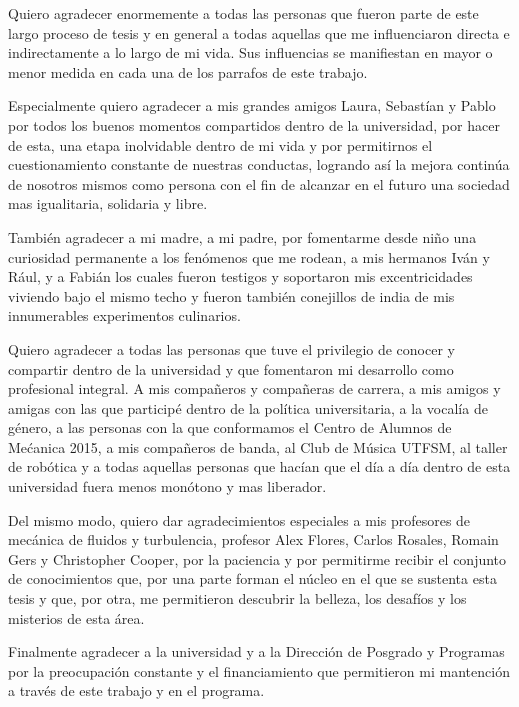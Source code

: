 \vspace{-1.5cm}

Quiero agradecer enormemente a todas las personas que fueron parte de este largo proceso de tesis y en general a todas aquellas que me influenciaron directa e indirectamente a lo largo de mi vida. Sus influencias se manifiestan en mayor o menor medida en cada una de los parrafos de este trabajo. 

Especialmente quiero agradecer a mis grandes amigos Laura, Sebastían y Pablo por todos los buenos momentos compartidos dentro de la universidad, por hacer de esta, una etapa inolvidable dentro de mi vida y por permitirnos el cuestionamiento constante de nuestras conductas, logrando así la mejora continúa de nosotros mismos como persona con el fin de alcanzar en el futuro una sociedad mas igualitaria, solidaria y libre. 

También agradecer a mi madre, a mi padre, por fomentarme desde niño una curiosidad permanente a los fenómenos que me rodean, a mis hermanos Iván y Rául, y a Fabián los cuales fueron testigos y soportaron mis excentricidades viviendo bajo el mismo techo y fueron también conejillos de india de mis innumerables experimentos culinarios.

Quiero agradecer a todas las personas que tuve el privilegio de conocer y compartir dentro de la universidad y que fomentaron mi desarrollo como profesional integral. A mis compañeros y compañeras de carrera, a mis amigos y amigas con las que participé dentro de la política universitaria, a la vocalía de género, a las personas con la que conformamos el Centro de Alumnos de Mećanica 2015, a mis compañeros de banda, al Club de Música UTFSM, al taller de robótica y a todas aquellas personas que hacían que el día a día dentro de esta universidad fuera menos monótono y mas liberador. 

Del mismo modo, quiero dar agradecimientos especiales a mis profesores de mecánica de fluidos y turbulencia, profesor Alex Flores, Carlos Rosales, Romain Gers y Christopher Cooper, por la paciencia y por permitirme recibir el conjunto de conocimientos que, por una parte forman el núcleo en el que se sustenta esta tesis y que, por otra, me permitieron descubrir la belleza, los desafíos y los misterios de esta área.

Finalmente agradecer a la universidad y a la Dirección de Posgrado y Programas por la preocupación constante y el financiamiento que permitieron mi mantención a través de este trabajo y en el programa.
